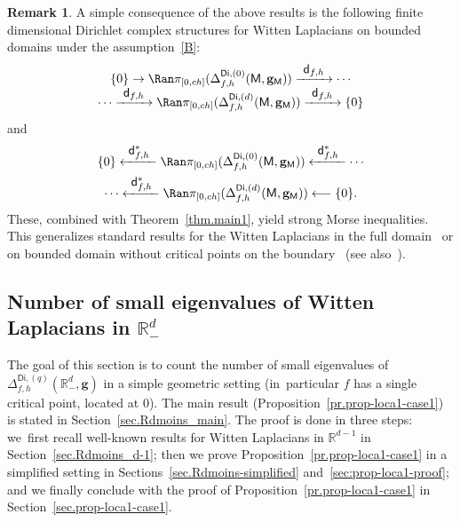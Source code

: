 \documentclass[JEP,XML,SOM,Unicode,NoEqCountersInSection,NoFloatCountersInSection,published]{cedram}
\newcommand\from{\mathchoice{\longleftarrow}{\leftarrow}{\leftarrow}{\leftarrow}}
\newcommand\To[1]{\mathchoice{\xrightarrow{\textstyle\kern4pt#1\kern3pt}}{\stackrel{#1}{\longrightarrow}}{}{}}
\newcommand\From[1]{\mathchoice{\xleftarrow{\textstyle~#1~}}{\stackrel{#1}{\longleftarrow}}{}{}}
\newcommand{\mbf}[1]{\mathbf{#1}}
\theoremstyle{plain}
\theoremstyle{definition}
\newtheorem{remark}[proposition]{Remark}
\begin{document}
\begin{remark}\label{rem:Morse}
A simple consequence of the above results is the following finite
dimensional Dirichlet complex structures for Witten Laplacians on
bounded domains under the assumption~\ref{B}:
\begin{multline*}\vspace*{-5pt}
\{0\} \to
\Ran \pi_{[0,ch]}(\Delta^{\mathsf{Di},(0)}_{f,h}(\mathsf M,\mbf
g_{\mathsf M})) \To{\mathsf d_{f,h}}\cdots\\
\cdots
\To{\mathsf d_{f,h}}
\Ran \pi_{[0,ch]}(\Delta^{\mathsf{Di},(d)}_{f,h}(\mathsf M,\mbf
g_{\mathsf M})) \To{\mathsf d_{f,h}}\{0\}
\end{multline*}
and\vspace*{-5pt}
\begin{multline*}
\{0\} \From{\mathsf d_{f,h}^*}
\Ran \pi_{[0,ch]}(\Delta^{\mathsf{Di},(0)}_{f,h}(\mathsf M,\mbf g_{\mathsf
M})) \From{\mathsf d_{f,h}^*} \cdots\\
\cdots \From{\mathsf
d_{f,h}^*} \Ran \pi_{[0,ch]}(\Delta^{\mathsf{Di},(d)}_{f,h}(\mathsf
M,\mbf g_{\mathsf M})) \from\{0\}.
\end{multline*}
These, combined with Theorem~\ref{thm.main1}, yield strong Morse
inequalities. This generalizes standard results for the Witten Laplacians in the
full domain~\cite{helffer-sjostrand-85,CFKS,witten-82} or on bounded domain without critical points on
the
boundary~\cite{helffer-nier-06,le-peutrec-10} (see also~\cite{laudenbach2011morse,CL}).
\end{remark}

\subsection{Number of small eigenvalues of Witten Laplacians in $\mathbb R^d_-$}\label{sec.Rdmoins}

The goal of this section is to
count the number of small eigenvalues of $\Delta_{f,h}^{\mathsf{Di},(q)} (\mathbb R^d_-,\mbf g)$ in a simple geometric setting (in~particular
$f$ has a single critical point, located at $0$). The main result
(Proposition~\ref{pr.prop-loca1-case1}) is
stated in Section~\ref{sec.Rdmoins_main}. The proof is done in three
steps: we~first recall well-known results for Witten Laplacians in
$\mathbb R^{d-1}$ in Section~\ref{sec.Rdmoins_d-1}; then we prove Proposition~\ref{pr.prop-loca1-case1}
in a simplified setting in Sections~\ref{sec.Rdmoins-simplified}
and~\ref{sec:prop-loca1-proof}; and we finally conclude with the proof
of Proposition~\ref{pr.prop-loca1-case1} in Section~\ref{sec.prop-loca1-case1}.
\end{document}
